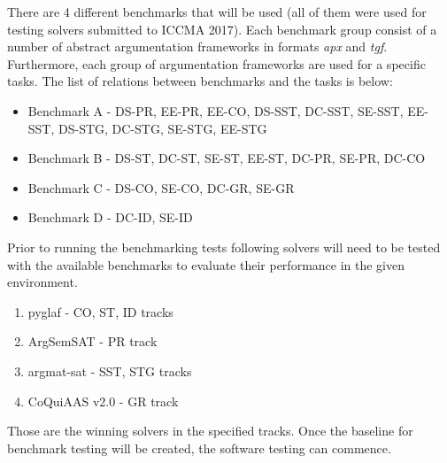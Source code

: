 There are 4 different benchmarks that will be used (all of them were used for testing solvers submitted to ICCMA 2017). Each benchmark group consist of a number of abstract argumentation frameworks in formats \textit{apx} and \textit{tgf}. Furthermore, each group of argumentation frameworks are used for a specific tasks. The list of relations between benchmarks and the tasks is below:
\begin{itemize}
	\item{Benchmark A - DS-PR, EE-PR, EE-CO, DS-SST, DC-SST, SE-SST, EE-SST, DS-STG, DC-STG, SE-STG, EE-STG}
	\item{Benchmark B - DS-ST, DC-ST, SE-ST, EE-ST, DC-PR, SE-PR, DC-CO}
	\item{Benchmark C - DS-CO, SE-CO, DC-GR, SE-GR}
	\item{Benchmark D - DC-ID, SE-ID}
\end{itemize}

Prior to running the benchmarking tests following solvers will need to be tested with the available benchmarks to evaluate their performance in the given environment.
\begin{enumerate}
	\item{pyglaf - CO, ST, ID tracks}
	\item{ArgSemSAT - PR track}
	\item{argmat-sat - SST, STG tracks}
	\item{CoQuiAAS v2.0 - GR track}
\end{enumerate}
Those are the winning solvers in the specified tracks. Once the baseline for benchmark testing will be created, the software testing can commence.